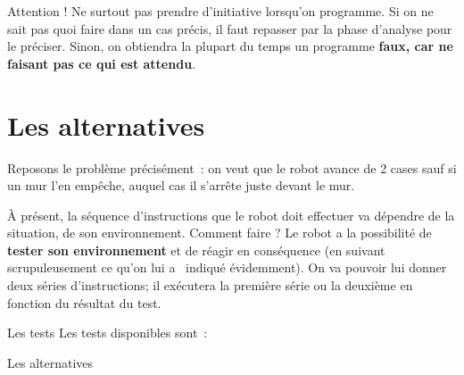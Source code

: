 	Attention ! Ne surtout pas prendre d'initiative
	lorsqu'on programme. Si on ne sait pas quoi faire dans
	un cas précis, il faut repasser par la phase d'analyse
	pour le préciser. Sinon, on obtiendra la plupart du temps un programme
	\textbf{faux, car ne faisant pas ce qui est attendu}.

\section{Les alternatives}

	Reposons le problème précisément~: on veut que le robot avance de 2
	cases sauf si un mur l'en empêche, auquel cas il
	s'arrête juste devant le mur.
	
	À présent, la séquence d'instructions que le robot doit
	effectuer va dépendre de la situation, de son environnement. Comment
	faire ? Le robot a la possibilité de \textbf{tester son environnement}
	et de réagir en conséquence (en suivant scrupuleusement ce
	qu'on lui a \ indiqué évidemment). On va pouvoir lui
	donner deux séries d'instructions; il exécutera la
	première série ou la deuxième en fonction du résultat du test.

	
	\begin{Emphase}[definition]{Les tests}
	Les tests disponibles sont~:
	
	\end{Emphase}

	
	\begin{Emphase}[definition]{Les alternatives}
	\end{Emphase}

